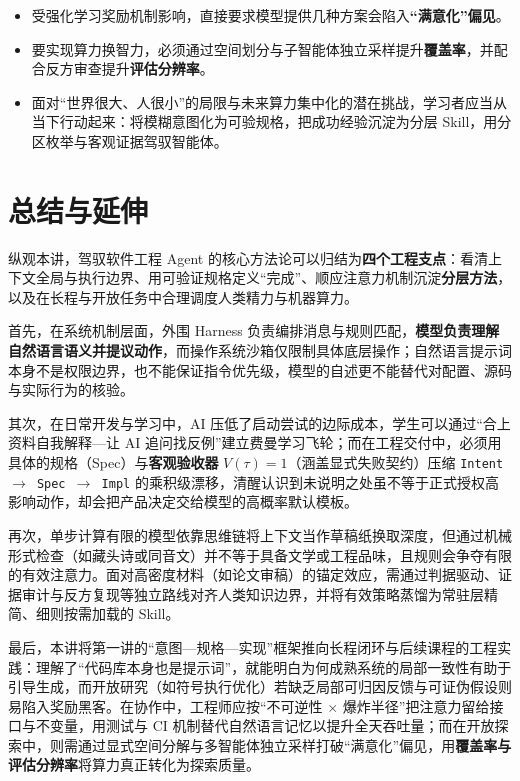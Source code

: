 \documentclass[UTF8,a4paper,11pt,fontset=fandol]{ctexart}
\begin{document}
\begin{itemize}
\item 受强化学习奖励机制影响，直接要求模型提供几种方案会陷入\textbf{“满意化”偏见}。

\item 要实现算力换智力，必须通过空间划分与子智能体独立采样提升\textbf{覆盖率}，并配合反方审查提升\textbf{评估分辨率}。

\item 面对“世界很大、人很小”的局限与未来算力集中化的潜在挑战，学习者应当从当下行动起来：将模糊意图化为可验规格，把成功经验沉淀为分层 Skill，用分区枚举与客观证据驾驭智能体。
\end{itemize}

\section{总结与延伸}

纵观本讲，驾驭软件工程 Agent 的核心方法论可以归结为\textbf{四个工程支点}：看清上下文全局与执行边界、用可验证规格定义“完成”、顺应注意力机制沉淀\textbf{分层方法}，以及在长程与开放任务中合理调度人类精力与机器算力。



首先，在系统机制层面，外围 Harness 负责编排消息与规则匹配，\textbf{模型负责理解自然语言语义并提议动作}，而操作系统沙箱仅限制具体底层操作；自然语言提示词本身不是权限边界，也不能保证指令优先级，模型的自述更不能替代对配置、源码与实际行为的核验。

其次，在日常开发与学习中，AI 压低了启动尝试的边际成本，学生可以通过“合上资料自我解释—让 AI 追问找反例”建立费曼学习飞轮；而在工程交付中，必须用具体的规格（Spec）与\textbf{客观验收器} \(V(\tau)=1\)（涵盖显式失败契约）压缩 \texttt{Intent \ensuremath{\rightarrow} Spec \ensuremath{\rightarrow} Impl} 的乘积级漂移，清醒认识到未说明之处虽不等于正式授权高影响动作，却会把产品决定交给模型的高概率默认模板。



再次，单步计算有限的模型依靠思维链将上下文当作草稿纸换取深度，但通过机械形式检查（如藏头诗或同音文）并不等于具备文学或工程品味，且规则会争夺有限的有效注意力。面对高密度材料（如论文审稿）的锚定效应，需通过判据驱动、证据审计与反方复现等独立路线对齐人类知识边界，并将有效策略蒸馏为常驻层精简、细则按需加载的 Skill。



最后，本讲将第一讲的“意图—规格—实现”框架推向长程闭环与后续课程的工程实践：理解了“代码库本身也是提示词”，就能明白为何成熟系统的局部一致性有助于引导生成，而开放研究（如符号执行优化）若缺乏局部可归因反馈与可证伪假设则易陷入奖励黑客。在协作中，工程师应按“不可逆性 \ensuremath{\times} 爆炸半径”把注意力留给接口与不变量，用测试与 CI 机制替代自然语言记忆以提升全天吞吐量；而在开放探索中，则需通过显式空间分解与多智能体独立采样打破“满意化”偏见，用\textbf{覆盖率与评估分辨率}将算力真正转化为探索质量。
\end{document}
